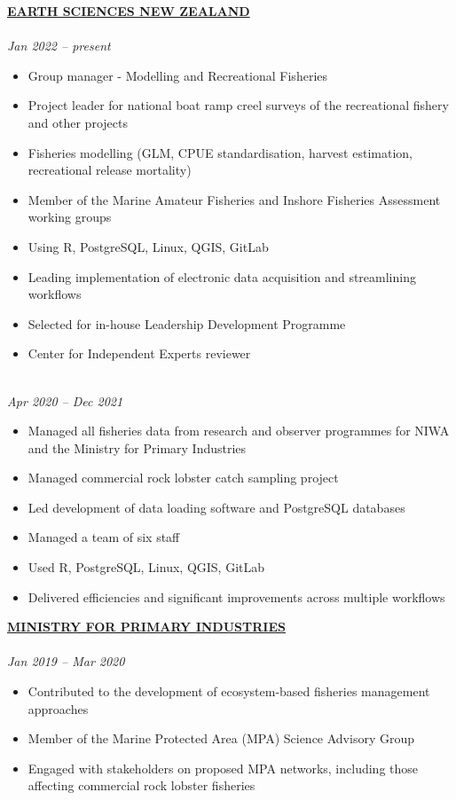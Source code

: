 \documentclass[10pt,a4paper]{article}
\begin{document}
\textbf{\href{https://earthsciences.nz/}{EARTH SCIENCES NEW ZEALAND}}  \\
 \\
\textit{Jan 2022 -- present}
\begin{itemize}[itemsep=2pt, parsep=0pt]
  \item Group manager - Modelling and Recreational Fisheries 
  \item Project leader for national boat ramp creel surveys of the recreational fishery and other projects
  \item Fisheries modelling (GLM, CPUE standardisation, harvest estimation, recreational release mortality)
  \item Member of the Marine Amateur Fisheries and Inshore Fisheries Assessment working groups
  \item Using R, PostgreSQL, Linux, QGIS, GitLab
  \item Leading implementation of electronic data acquisition and streamlining workflows
  \item Selected for in-house Leadership Development Programme
  \item Center for Independent Experts reviewer
\end{itemize}



\noindent {} \\
\textit{Apr 2020 -- Dec 2021}
\begin{itemize}[itemsep=2pt, parsep=0pt]
  \item Managed all fisheries data from research and observer programmes for NIWA and the Ministry for Primary Industries
  \item Managed commercial rock lobster catch sampling project
  \item Led development of data loading software and PostgreSQL databases
  \item Managed a team of six staff
  \item Used R, PostgreSQL, Linux, QGIS, GitLab
  \item Delivered efficiencies and significant improvements across multiple workflows\\
\end{itemize}



\noindent \textbf{\href{https://www.mpi.govt.nz}{MINISTRY FOR PRIMARY INDUSTRIES}} \\
 \\
\textit{Jan 2019 -- Mar 2020}
\begin{itemize}[itemsep=2pt, parsep=0pt]
  \item Contributed to the development of ecosystem-based fisheries management approaches
  \item Member of the Marine Protected Area (MPA) Science Advisory Group
  \item Engaged with stakeholders on proposed MPA networks, including those affecting commercial rock lobster fisheries\\
\end{itemize}
\end{document}
